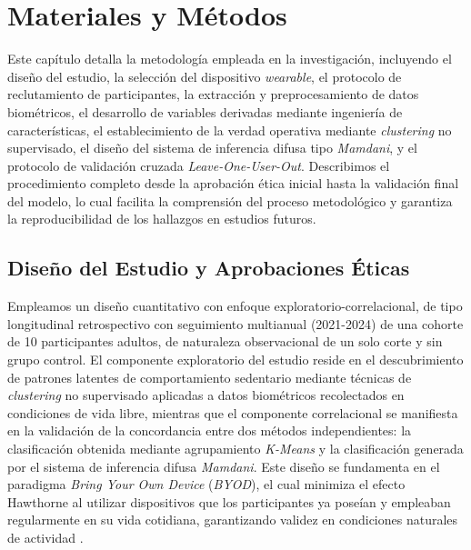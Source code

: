 \chapter{Materiales y Métodos}
\label{chap:materiales_metodos}

\noindent Este capítulo detalla la metodología empleada en la investigación, incluyendo el diseño del estudio, la selección del dispositivo \textit{wearable}, el protocolo de reclutamiento de participantes, la extracción y preprocesamiento de datos biométricos, el desarrollo de variables derivadas mediante ingeniería de características, el establecimiento de la verdad operativa mediante \textit{clustering} no supervisado, el diseño del sistema de inferencia difusa tipo \textit{Mamdani}, y el protocolo de validación cruzada \textit{Leave-One-User-Out}. Describimos el procedimiento completo desde la aprobación ética inicial hasta la validación final del modelo, lo cual facilita la comprensión del proceso metodológico y garantiza la reproducibilidad de los hallazgos en estudios futuros.


\section{Diseño del Estudio y Aprobaciones Éticas}
\label{sec:diseno}

Empleamos un diseño cuantitativo con enfoque exploratorio-correlacional, de tipo longitudinal retrospectivo con seguimiento multianual (2021-2024) de una cohorte de 10 participantes adultos, de naturaleza observacional de un solo corte y sin grupo control. El componente exploratorio del estudio reside en el descubrimiento de patrones latentes de comportamiento sedentario mediante técnicas de \textit{clustering} no supervisado aplicadas a datos biométricos recolectados en condiciones de vida libre, mientras que el componente correlacional se manifiesta en la validación de la concordancia entre dos métodos independientes: la clasificación obtenida mediante agrupamiento \textit{K-Means} y la clasificación generada por el sistema de inferencia difusa \textit{Mamdani}. Este diseño se fundamenta en el paradigma \textit{Bring Your Own Device} (\textit{BYOD}), el cual minimiza el efecto Hawthorne al utilizar dispositivos que los participantes ya poseían y empleaban regularmente en su vida cotidiana, garantizando validez en condiciones naturales de actividad \cite{Doherty2021}.

